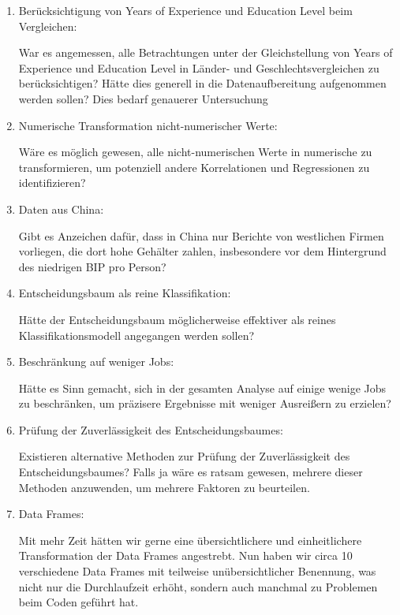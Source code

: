 \documentclass[
  letterpaper,
  DIV=11,
  numbers=noendperiod]{scrartcl}
\begin{document}
\begin{enumerate}
\def\labelenumi{\arabic{enumi}.}
\item
  Berücksichtigung von Years of Experience und Education Level beim
  Vergleichen:

  War es angemessen, alle Betrachtungen unter der Gleichstellung von
  Years of Experience und Education Level in Länder- und
  Geschlechtsvergleichen zu berücksichtigen? Hätte dies generell in die
  Datenaufbereitung aufgenommen werden sollen? Dies bedarf genauerer
  Untersuchung
\item
  Numerische Transformation nicht-numerischer Werte:

  Wäre es möglich gewesen, alle nicht-numerischen Werte in numerische zu
  transformieren, um potenziell andere Korrelationen und Regressionen zu
  identifizieren?
\item
  Daten aus China:

  Gibt es Anzeichen dafür, dass in China nur Berichte von westlichen
  Firmen vorliegen, die dort hohe Gehälter zahlen, insbesondere vor dem
  Hintergrund des niedrigen BIP pro Person?
\item
  Entscheidungsbaum als reine Klassifikation:

  Hätte der Entscheidungsbaum möglicherweise effektiver als reines
  Klassifikationsmodell angegangen werden sollen?
\item
  Beschränkung auf weniger Jobs:

  Hätte es Sinn gemacht, sich in der gesamten Analyse auf einige wenige
  Jobs zu beschränken, um präzisere Ergebnisse mit weniger Ausreißern zu
  erzielen?
\item
  Prüfung der Zuverlässigkeit des Entscheidungsbaumes:

  Existieren alternative Methoden zur Prüfung der Zuverlässigkeit des
  Entscheidungsbaumes? Falls ja wäre es ratsam gewesen, mehrere dieser
  Methoden anzuwenden, um mehrere Faktoren zu beurteilen.
\item
  Data Frames:

  Mit mehr Zeit hätten wir gerne eine übersichtlichere und
  einheitlichere Transformation der Data Frames angestrebt. Nun haben
  wir circa 10 verschiedene Data Frames mit teilweise unübersichtlicher
  Benennung, was nicht nur die Durchlaufzeit erhöht, sondern auch
  manchmal zu Problemen beim Coden geführt hat.
\end{enumerate}
\end{document}

